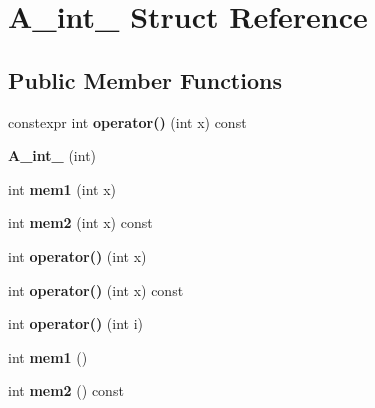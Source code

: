 \hypertarget{struct_a__int__1}{}\section{A\+\_\+int\+\_ Struct Reference}
\label{struct_a__int__1}
\subsection*{Public Member Functions}
\begin{DoxyCompactItemize}
\item 
\mbox{\label{struct_a__int__1_a4002e7e2e402accc123ba021f81d0b5f}} 
constexpr int {\bfseries operator()} (int x) const
\item 
\mbox{\label{struct_a__int__1_a1e28be19527361de96515b13ae703ea1}} 
{\bfseries A\+\_\+int\+\_} (int)
\item 
\mbox{\label{struct_a__int__1_a9c44be2193b43ff2f901dba6130b4028}} 
int {\bfseries mem1} (int x)
\item 
\mbox{\label{struct_a__int__1_a1a886bd966e1a19a456f4ad8b8faa4f1}} 
int {\bfseries mem2} (int x) const
\item 
\mbox{\label{struct_a__int__1_a208ba9f47dd3c922af56abdd6725aaa3}} 
int {\bfseries operator()} (int x)
\item 
\mbox{\label{struct_a__int__1_a7816983824791cdd410ad4ad13baaffb}} 
int {\bfseries operator()} (int x) const
\item 
\mbox{\label{struct_a__int__1_a5fe50bb0502c9f3330af638ae55cabaa}} 
int {\bfseries operator()} (int i)
\item 
\mbox{\label{struct_a__int__1_ad6cb740e082115bf4eb68e7ff07efd97}} 
int {\bfseries mem1} ()
\item 
\mbox{\label{struct_a__int__1_a61b057b1e535b41afdec8350518635c7}} 
int {\bfseries mem2} () const
\item 
\mbox{\label{struct_a__int__1_a5fe50bb0502c9f3330af638ae55cabaa}} 

\end{DoxyCompactItemize}
